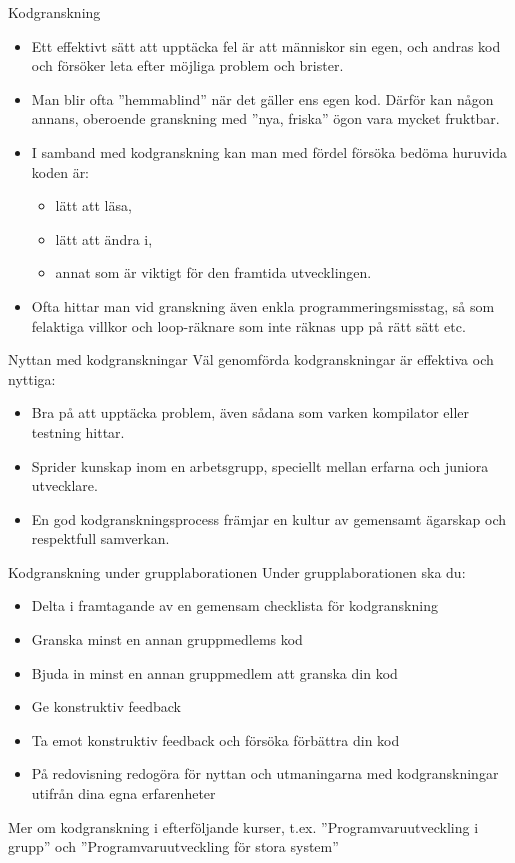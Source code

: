 

\begin{Slide}{Kodgranskning}
\begin{itemize}
\item Ett effektivt sätt att upptäcka fel är att människor  sin egen, och andras kod och försöker leta efter möjliga problem och brister. 
\item Man blir ofta ''hemmablind'' när det gäller ens egen kod. Därför kan någon annans, oberoende granskning med ''nya, friska'' ögon vara mycket fruktbar. 
\item I samband med kodgranskning kan man med fördel försöka bedöma  huruvida koden är:
\begin{itemize}
\item lätt att läsa, 
\item lätt att ändra i,  
\item annat som är viktigt för den framtida utvecklingen.
\end{itemize}
\item Ofta hittar man vid granskning även enkla programmeringsmisstag, så som felaktiga villkor och loop-räknare som inte räknas upp på rätt sätt etc.
\end{itemize}
\end{Slide}

\begin{Slide}{Nyttan med kodgranskningar}
Väl genomförda kodgranskningar är effektiva och nyttiga:
\begin{itemize}
\item Bra på att upptäcka problem, även sådana som varken kompilator eller testning hittar.
\item Sprider kunskap inom en arbetsgrupp, speciellt mellan erfarna och juniora utvecklare.
\item En god kodgranskningsprocess främjar en kultur av gemensamt ägarskap och respektfull samverkan.
\end{itemize}
\end{Slide}


\begin{Slide}{Kodgranskning under grupplaborationen}
Under grupplaborationen ska du:
\begin{itemize}
\item Delta i framtagande av en gemensam checklista för kodgranskning
\item Granska minst en annan gruppmedlems kod 
\item Bjuda in minst en annan gruppmedlem att granska din kod
\item Ge konstruktiv feedback
\item Ta emot konstruktiv feedback och försöka förbättra din kod
\item På redovisning redogöra för nyttan och utmaningarna med kodgranskningar utifrån dina egna erfarenheter
\end{itemize}
Mer om kodgranskning i efterföljande kurser, t.ex. ''Programvaruutveckling i grupp'' och ''Programvaruutveckling för stora system''
\end{Slide}
